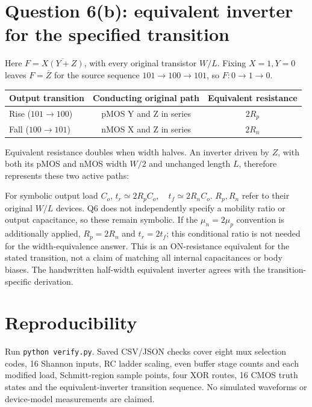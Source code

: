 \documentclass[10pt]{article}
\newcommand{\mos}[4]{\begin{scope}[shift={(#1,#2)}]
\draw(0,.24)--(0,-.24);\draw(0,.2)--(.25,.2)--(.25,.5);\draw(0,-.2)--(.25,-.2)--(.25,-.5);
\draw(-.16,.23)--(-.16,-.23);
\ifnum#4=1\draw(-.26,0)circle(.06);\draw(-.75,0)--(-.32,0);\else\draw(-.75,0)--(-.16,0);\fi
\node[anchor=east,font=\scriptsize]at(-.76,0){$#3$};\end{scope}}
\newcommand{\gnd}[2]{\draw(#1,#2)--(#1,{#2-.12});\draw({#1-.17},{#2-.12})--({#1+.17},{#2-.12});\draw({#1-.11},{#2-.2})--({#1+.11},{#2-.2});}
\newcommand{\rail}[3]{\draw(#1,#2)--(#1,{#2+.14});\node[above,font=\scriptsize]at(#1,{#2+.14}){$#3$};}
\begin{document}
\newpage\section*{Question 6(b): equivalent inverter for the specified transition}
Here $F=\overline{X(Y+Z)}$, with every original transistor $W/L$. Fixing $X=1,Y=0$ leaves $F=\overline Z$ for the source sequence $101\to100\to101$, so $F:0\to1\to0$.
\begin{center}\begin{tabular}{lcc}\toprule
Output transition&Conducting original path&Equivalent resistance\\\midrule
Rise ($101\to100$)&pMOS Y and Z in series&$2R_p$\\
Fall ($100\to101$)&nMOS X and Z in series&$2R_n$\\\bottomrule
\end{tabular}\end{center}
Equivalent resistance doubles when width halves. An inverter driven by $Z$, with both its pMOS and nMOS width $W/2$ and unchanged length $L$, therefore represents these two active paths:
\begin{center}\end{center}
For symbolic output load $C_o$, $\boxed{t_r\simeq2R_pC_o,\quad t_f\simeq2R_nC_o}$. $R_p,R_n$ refer to their original $W/L$ devices. Q6 does not independently specify a mobility ratio or output capacitance, so these remain symbolic. If the $\mu_n=2\mu_p$ convention is additionally applied, $R_p=2R_n$ and $t_r=2t_f$; this conditional ratio is not needed for the width-equivalence answer. This is an ON-resistance equivalent for the stated transition, not a claim of matching all internal capacitances or body biases. The handwritten half-width equivalent inverter agrees with the transition-specific derivation.

\section*{Reproducibility}
Run \texttt{python verify.py}. Saved CSV/JSON checks cover eight mux selection codes, 16 Shannon inputs, RC ladder scaling, even buffer stage counts and each modified load, Schmitt-region sample points, four XOR routes, 16 CMOS truth states and the equivalent-inverter transition sequence. No simulated waveforms or device-model measurements are claimed.
\end{document}
